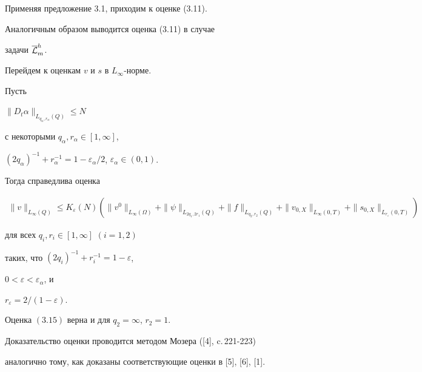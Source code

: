 \addtocounter{equation}{1}


Применяя предложение 3.1, приходим к оценке (3.11).





Аналогичным образом выводится оценка (3.11) в случае


задачи $\overline{\cal L}_m^h$.





Перейдем к оценкам $v$ и $s$ в $L_\infty$-норме.





\begin{props}  Пусть


$\|D_t\alpha\|_{L_{q_\alpha,r_\alpha}(Q)}\le N$


с некоторыми $q_\alpha,r_\alpha\in [1,\infty]$,


$(2q_\alpha)^{-1}+r_{\alpha}^{-1}=


1-\varepsilon_{\alpha}/2$, $\varepsilon_{\alpha}\in (0,1)$.


Тогда справедлива оценка


\begin{multline}


\|v\|_{L_\infty(Q)}\le K_\varepsilon(N)(\|v^0\|_{L_\infty(\Omega)}+


\|\psi\|_{L_{2q_1,2r_1}(Q)}+\|f\|_{L_{q_2,r_2}(Q)}+


\|v_{0,X}\|_{L_\infty(0,T)}+\|s_{0,X}\|_{L_{r_\varepsilon}(0,T)})


\end{multline}


для всех $q_i,r_i\in [1,\infty]$ $(i=1,2)$


таких, что $(2q_i)^{-1}+r_i^{-1}=1-\varepsilon$,


$0<\varepsilon<\varepsilon_{\alpha}$, и


$r_{\varepsilon}=2/(1-\varepsilon)$.


Оценка $(3.15)$ верна и для $q_2=\infty$, $r_2=1$.


\end{props}





Доказательство оценки проводится методом Мозера ([4], c.\,221-223)


аналогично тому, как доказаны соответствующие оценки в [5], [6], [1].





